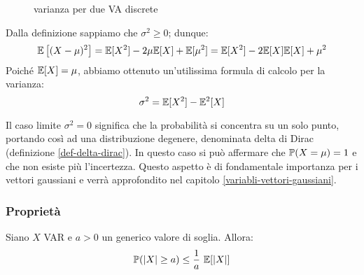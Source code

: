 \begin{figure}[ht]
  \caption{varianza per due VA discrete}
\end{figure}

\begin{oss}
  Dalla definizione sappiamo che $\sigma^2 \geq 0$; dunque:
  $$\mathbb E\left[(X-\mu)^2\right] = \mathbb E[X^2] - 2\mu \mathbb E[X] + \mathbb E[\mu^2] =
  \mathbb E[X^2] - 2 \mathbb E[X] \mathbb E[X] + \mu^2
  $$
  Poiché $\mathbb E[X] =\mu$, abbiamo ottenuto un'utilissima formula di calcolo per la varianza:
  $$\sigma^2 = \mathbb E[X^2] - \mathbb E^2[X]$$
\end{oss}
Il caso limite $\sigma^2 = 0$ significa che la probabilità si concentra su un solo punto, portando così ad una distribuzione degenere, denominata delta di Dirac (definizione \ref{def-delta-dirac}).
In questo caso si può affermare che $\mathbb P(X = \mu) = 1$ e che non esiste più l'incertezza.
Questo aspetto è di fondamentale importanza per i vettori gaussiani e verrà approfondito nel capitolo \ref{variabli-vettori-gaussiani}.

\subsubsection{Proprietà}
\begin{teo}\label{markov}
  Siano $X$ VAR e $a>0$ un generico valore di soglia.
  Allora:
  $$\mathbb P(\lvert X\rvert \ge a) \le \frac{1}{a} \ \mathbb E[\lvert X\rvert]$$
\end{teo}

